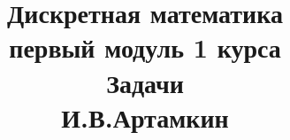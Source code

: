\documentclass[fleqn]{article}
\title{Дискретная математика \\ первый модуль 1 курса \\ Задачи \\ И.В.Артамкин}
\begin{document}
	\maketitle
	\pagebreak
	
	
	\tableofcontents
	
	\newpage
	
			
\end{document}
